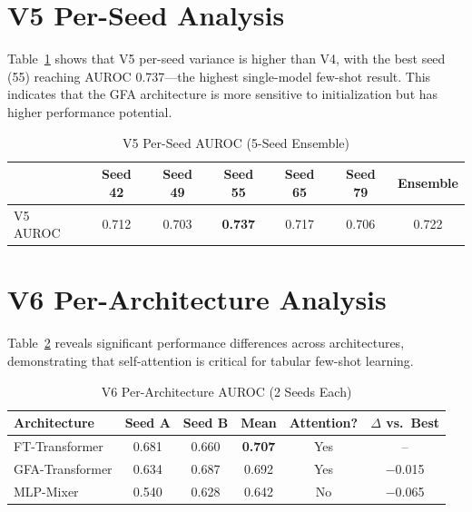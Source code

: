 \section{V5 Per-Seed Analysis}

Table~\ref{tab:v5_per_seed} shows that V5 per-seed variance is higher than V4, with the best seed (55) reaching AUROC 0.737---the highest single-model few-shot result. This indicates that the GFA architecture is more sensitive to initialization but has higher performance potential.

\begin{table}[htbp]
\centering
\caption{V5 Per-Seed AUROC (5-Seed Ensemble)}
\small
\begin{tabular}{lcccccc}
\toprule
 & Seed 42 & Seed 49 & Seed 55 & Seed 65 & Seed 79 & Ensemble \\
\midrule
V5 AUROC & 0.712 & 0.703 & \textbf{0.737} & 0.717 & 0.706 & 0.722 \\
\bottomrule
\end{tabular}
\label{tab:v5_per_seed}
\end{table}

\section{V6 Per-Architecture Analysis}

Table~\ref{tab:v6_per_arch} reveals significant performance differences across architectures, demonstrating that self-attention is critical for tabular few-shot learning.

\begin{table}[htbp]
\centering
\caption{V6 Per-Architecture AUROC (2 Seeds Each)}
\small
\begin{tabular}{lccccc}
\toprule
Architecture & Seed A & Seed B & Mean & Attention? & $\Delta$ vs.\ Best \\
\midrule
FT-Transformer & 0.681 & 0.660 & \textbf{0.707} & Yes & -- \\
GFA-Transformer & 0.634 & 0.687 & 0.692 & Yes & $-$0.015 \\
MLP-Mixer & 0.540 & 0.628 & 0.642 & No & $-$0.065 \\
\bottomrule
\end{tabular}
\label{tab:v6_per_arch}
\end{table}

